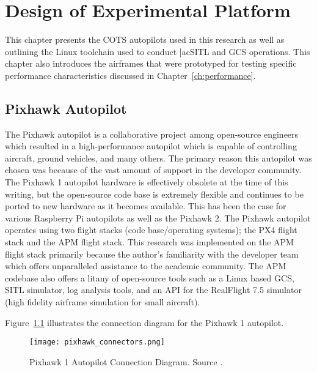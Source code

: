 \chapter{Design of Experimental Platform}\label{ch:platform}

This chapter presents the \ac{COTS} autopilots used in this research as well as outlining the Linux toolchain used to conduct |ac{SITL} and \ac{GCS} operations.  This chapter also introduces the airframes that were prototyped for testing specific performance characteristics discussed in Chapter~\ref{ch:performance}.

\section{Pixhawk Autopilot}
The Pixhawk autopilot is a collaborative project among open-source engineers which resulted in a high-performance autopilot which is capable of controlling aircraft, ground vehicles, and many others.  The primary reason this autopilot was chosen was because of the vast amount of support in the developer community.  The Pixhawk 1 autopilot hardware is effectively obsolete at the time of this writing, but the open-source code base is extremely flexible and continues to be ported to new hardware as it becomes available.  This has been the case for various Raspberry Pi autopilots as well as the Pixhawk 2.  The Pixhawk autopilot operates using two flight stacks (code base/operating systems); the PX4 flight stack and the \ac{APM} flight stack.  This research was implemented on the \ac{APM} flight stack primarily because the author's familiarity with the developer team which offers unparalleled assistance to the academic community.  The \ac{APM} codebase also offers a litany of open-source tools such as a Linux based \ac{GCS}, \ac{SITL} simulator, log analysis tools, and an \ac{API} for the RealFlight 7.5 simulator (high fidelity airframe simulation for small aircraft).

Figure~\ref{fig:pixhawk_autopilot} illustrates the connection diagram for the Pixhawk 1 autopilot.

\begin{figure}[h!]
 \centering
  \texttt{[image: pixhawk\_connectors.png]}
  \caption{Pixhawk 1 Autopilot Connection Diagram.  Source \cite{apm_org}.}
  \label{fig:pixhawk_autopilot}
\end{figure}

